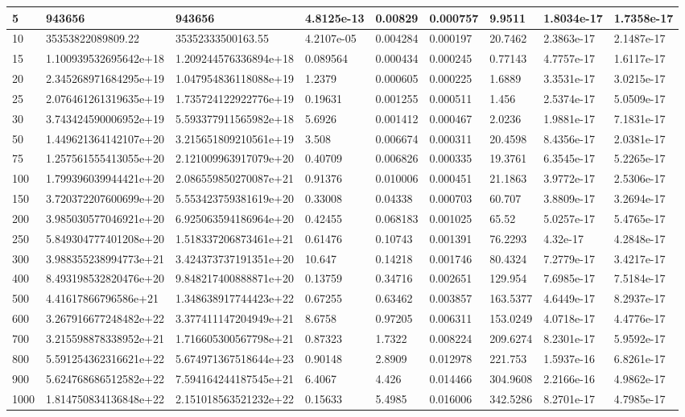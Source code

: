 \begin{tabular}{|l|l|l|l|l|l|l|l|l|}
\hline
5&943656&943656&4.8125e-13&0.00829&0.000757&9.9511&1.8034e-17&1.7358e-17\\\hline
10&35353822089809.22&35352333500163.55&4.2107e-05&0.004284&0.000197&20.7462&2.3863e-17&2.1487e-17\\\hline
15&1.100939532695642e+18&1.209244576336894e+18&0.089564&0.000434&0.000245&0.77143&4.7757e-17&1.6117e-17\\\hline
20&2.345268971684295e+19&1.047954836118088e+19&1.2379&0.000605&0.000225&1.6889&3.3531e-17&3.0215e-17\\\hline
25&2.076461261319635e+19&1.735724122922776e+19&0.19631&0.001255&0.000511&1.456&2.5374e-17&5.0509e-17\\\hline
30&3.743424590006952e+19&5.593377911565982e+18&5.6926&0.001412&0.000467&2.0236&1.9881e-17&7.1831e-17\\\hline
50&1.449621364142107e+20&3.215651809210561e+19&3.508&0.006674&0.000311&20.4598&8.4356e-17&2.0381e-17\\\hline
75&1.257561555413055e+20&2.121009963917079e+20&0.40709&0.006826&0.000335&19.3761&6.3545e-17&5.2265e-17\\\hline
100&1.799396039944421e+20&2.086559850270087e+21&0.91376&0.010006&0.000451&21.1863&3.9772e-17&2.5306e-17\\\hline
150&3.720372207600699e+20&5.553423759381619e+20&0.33008&0.04338&0.000703&60.707&3.8809e-17&3.2694e-17\\\hline
200&3.985030577046921e+20&6.925063594186964e+20&0.42455&0.068183&0.001025&65.52&5.0257e-17&5.4765e-17\\\hline
250&5.849304777401208e+20&1.518337206873461e+21&0.61476&0.10743&0.001391&76.2293&4.32e-17&4.2848e-17\\\hline
300&3.988355238994773e+21&3.424373737191351e+20&10.647&0.14218&0.001746&80.4324&7.2779e-17&3.4217e-17\\\hline
400&8.493198532820476e+20&9.848217400888871e+20&0.13759&0.34716&0.002651&129.954&7.6985e-17&7.5184e-17\\\hline
500&4.41617866796586e+21&1.348638917744423e+22&0.67255&0.63462&0.003857&163.5377&4.6449e-17&8.2937e-17\\\hline
600&3.267916677248482e+22&3.377411147204949e+21&8.6758&0.97205&0.006311&153.0249&4.0718e-17&4.4776e-17\\\hline
700&3.215598878338952e+21&1.716605300567798e+21&0.87323&1.7322&0.008224&209.6274&8.2301e-17&5.9592e-17\\\hline
800&5.591254362316621e+22&5.674971367518644e+23&0.90148&2.8909&0.012978&221.753&1.5937e-16&6.8261e-17\\\hline
900&5.624768686512582e+22&7.594164244187545e+21&6.4067&4.426&0.014466&304.9608&2.2166e-16&4.9862e-17\\\hline
1000&1.814750834136848e+22&2.151018563521232e+22&0.15633&5.4985&0.016006&342.5286&8.2701e-17&4.7985e-17\\\hline
\end{tabular}
